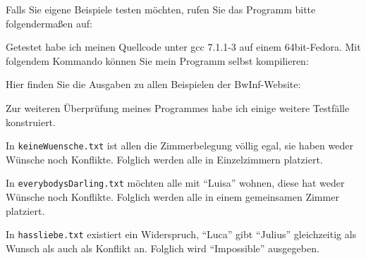 Falls Sie eigene Beispiele testen möchten,
rufen Sie das Programm bitte folgendermaßen auf:


Getestet habe ich meinen Quellcode unter gcc 7.1.1-3 auf einem 64bit-Fedora.
Mit folgendem Kommando können Sie mein Programm selbst kompilieren:


Hier finden Sie die Ausgaben zu allen Beispielen der BwInf-Website:








Zur weiteren Überprüfung meines Programmes habe ich einige weitere Testfälle konstruiert.

In \texttt{keineWuensche.txt} ist allen die Zimmerbelegung völlig egal,
sie haben weder Wünsche noch Konflikte.
Folglich werden alle in Einzelzimmern platziert.


In \texttt{everybodysDarling.txt} möchten alle mit "`Luisa"' wohnen,
diese hat weder Wünsche noch Konflikte.
Folglich werden alle in einem gemeinsamen Zimmer platziert.


In \texttt{hassliebe.txt} existiert ein Widerspruch, "`Luca"' gibt "`Julius"'
gleichzeitig als Wunsch als auch als Konflikt an.
Folglich wird "`Impossible"' ausgegeben.

